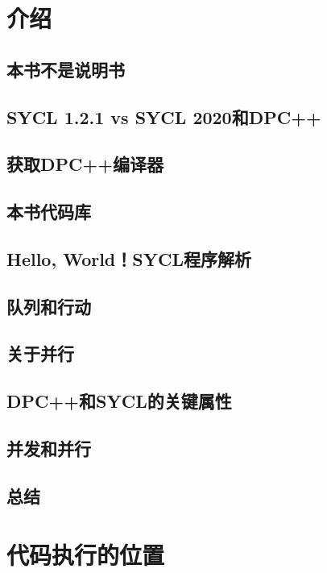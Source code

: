 \documentclass[11pt,a4paper,UTF8]{ctexart}
\begin{document}
	\section{介绍}
	
		\subsection{本书不是说明书}
		
		\subsection{SYCL 1.2.1 vs SYCL 2020和DPC++}
		
		\subsection{获取DPC++编译器}
		
		\subsection{本书代码库}
		
		\subsection{Hello, World！SYCL程序解析}
		
		\subsection{队列和行动}
		
		\subsection{关于并行}
		
		\subsection{DPC++和SYCL的关键属性}
		
		\subsection{并发和并行}
		
		\subsection{总结}
		
	\section{代码执行的位置}
	
\end{document}

